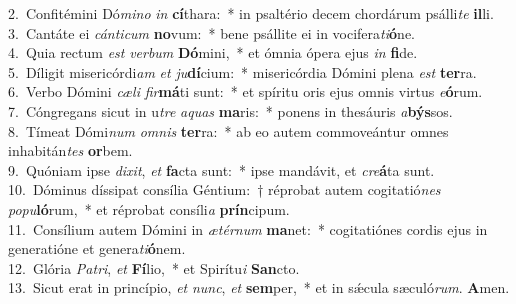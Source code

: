 {2.~}Confitémini Dó\textit{mi}\textit{no} \textit{in} \textbf{cí}thara:~* in psaltério decem chordárum psálli\textit{te} \textbf{il}li.\\
{3.~}Cantáte ei \textit{cán}\textit{ti}\textit{cum} \textbf{no}vum:~* bene psállite ei in vocifera\textit{ti}\textbf{ó}ne.\\
{4.~}Quia rectum \textit{est} \textit{ver}\textit{bum} \textbf{Dó}mini,~* et ómnia ópera ejus \textit{in} \textbf{fi}de.\\
{5.~}Díligit misericórdi\textit{am} \textit{et} \textit{ju}\textbf{dí}cium:~* misericórdia Dómini plena \textit{est} \textbf{ter}ra.\\
{6.~}Verbo Dómini \textit{cæ}\textit{li} \textit{fir}\textbf{má}ti sunt:~* et spíritu oris ejus omnis virtus \textit{e}\textbf{ó}rum.\\
{7.~}Cóngregans sicut in u\textit{tre} \textit{a}\textit{quas} \textbf{ma}ris:~* ponens in thesáuris \textit{a}\textbf{býs}sos.\\
{8.~}Tímeat Dómi\textit{num} \textit{om}\textit{nis} \textbf{ter}ra:~* ab eo autem commoveántur omnes inhabitán\textit{tes} \textbf{or}bem.\\
{9.~}Quóniam ipse \textit{di}\textit{xit}, \textit{et} \textbf{fa}cta sunt:~* ipse mandávit, et \textit{cre}\textbf{á}ta sunt.\\
{10.~}Dóminus díssipat consília Géntium:~† réprobat autem cogitatió\textit{nes} \textit{po}\textit{pu}\textbf{ló}rum,~* et réprobat consíli\textit{a} \textbf{prín}cipum.\\
{11.~}Consílium autem Dómini in \textit{æ}\textit{tér}\textit{num} \textbf{ma}net:~* cogitatiónes cordis ejus in generatióne et genera\textit{ti}\textbf{ó}nem.\\
{12.~}Glória \textit{Pa}\textit{tri}, \textit{et} \textbf{Fí}lio,~* et Spirítu\textit{i} \textbf{San}cto.\\
{13.~}Sicut erat in princípio, \textit{et} \textit{nunc}, \textit{et} \textbf{sem}per,~* et in sǽcula sæculó\textit{rum}. \textbf{A}men.\\
